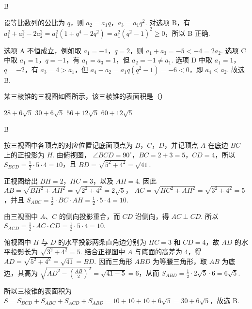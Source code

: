 \begin{answer}
B
\end{answer}

\begin{solution}
设等比数列的公比为 \(q\)，则 \(a_2=a_1q\)，\(a_3=a_1q^2\). 对选项 B，有
\(a_1^2+a_3^2-2a_2^2=a_1^2(1+q^4-2q^2)=a_1^2(q^2-1)^2\geqslant0\)，所以 B 正确.

选项 A 不恒成立，例如取 \(a_1=-1\)，\(q=2\)，则 \(a_1+a_3=-5<-4=2a_2\). 选项 C 中取 \(a_1=1\)，\(q=-1\)，有 \(a_1=a_3=1\)，但 \(a_2=-1\ne a_1\). 选项 D 中取 \(a_1=1\)，\(q=-2\)，有 \(a_3=4>a_1\)，但 \(a_4-a_2=a_1q(q^2-1)=-6<0\)，即 \(a_4<a_2\). 故选 B.
\end{solution}

\begin{problem}
某三棱锥的三视图如图所示，该三棱锥的表面积是（\quad）


\choices
    {\(28 + 6\sqrt{5}\)}
    {\(30 + 6\sqrt{5}\)}
    {\(56 + 12\sqrt{5}\)}
    {\(60 + 12\sqrt{5}\)}
\end{problem}

\begin{answer}
B
\end{answer}

\begin{solution}
按三视图中各顶点的对应位置记底面顶点为 \(B\)，\(C\)，\(D\)，并记顶点 \(A\) 在底边 \(BC\) 上的正投影为 \(H\). 由俯视图，
\(\angle BCD=90^\circ\)，\(BC=2+3=5\)，\(CD=4\)，所以
\(S_{BCD}=\frac{1}{2}\cdot5\cdot4=10\)，且
\(BD=\sqrt{5^2+4^2}=\sqrt{41}\).

正视图给出 \(BH=2\)，\(HC=3\)，以及 \(AH=4\). 因此
\(AB=\sqrt{BH^2+AH^2}=\sqrt{2^2+4^2}=2\sqrt{5}\)，
\(AC=\sqrt{HC^2+AH^2}=\sqrt{3^2+4^2}=5\)，并且
\(S_{ABC}=\frac{1}{2}\cdot BC\cdot AH=\frac{1}{2}\cdot5\cdot4=10\).

由三视图中 \(A\)、\(C\) 的侧向投影重合，而 \(CD\) 沿侧向，得 \(AC\perp CD\). 所以
\(S_{ACD}=\frac{1}{2}\cdot AC\cdot CD=\frac{1}{2}\cdot5\cdot4=10\).

俯视图中 \(H\) 与 \(D\) 的水平投影两条直角边分别为 \(HC=3\) 和 \(CD=4\)，故 \(AD\) 的水平投影长为
\(\sqrt{3^2+4^2}=5\). 结合正视图中 \(A\) 与底面的高差为 \(4\)，得
\(AD=\sqrt{5^2+4^2}=\sqrt{41}=BD\). 因而三角形 \(ABD\) 为等腰三角形，取 \(AB\) 为底边，其高为
\(\sqrt{AD^2-\left(\frac{AB}{2}\right)^2}=\sqrt{41-5}=6\)，从而
\(S_{ABD}=\frac{1}{2}\cdot2\sqrt{5}\cdot6=6\sqrt{5}\).

所以三棱锥的表面积为
\(S=S_{BCD}+S_{ABC}+S_{ACD}+S_{ABD}=10+10+10+6\sqrt{5}=30+6\sqrt{5}\)，故选 B.
\end{solution}

